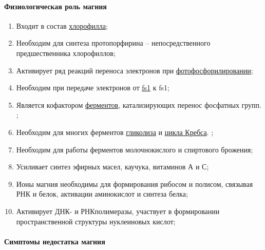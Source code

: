 \paragraph*{Физиологическая роль магния}

\begin{enumerate}
	\item Входит в состав \hyperlink{sect_hlorophilus}{хлорофилла};
	\item Необходим для синтеза протопорфирина -- непосредственного предшественника хлорофиллов;
	\item Активирует ряд реакций переноса электронов при \hyperlink{photophosforolysis}{фотофосфорилировании};
	\item Необходим при передаче электронов от \hyperlink{photosystems}{\gls{fs1}} к \gls{fs1};
	\item Является кофактором \hyperlink{enzimes}{ферментов}, катализирующих перенос фосфатных групп. ;
	\item Необходим для многих ферментов \hyperlink{glycolysis}{гликолиза} и \hyperlink{krebs_cycle}{цикла Кребса}.  ;
	\item Необходим для работы ферментов молочнокислого и спиртового брожения; 
	\item Усиливает синтез эфирных масел, каучука, витаминов А и С;
	\item Ионы магния необходимы для формирования рибосом и полисом, связывая РНК и белок, активации аминокислот и синтеза белка;
	\item Активирует ДНК- и РНКполимеразы, участвует в формировании пространственной структуры нуклеиновых кислот;
\end{enumerate}

\paragraph*{Симптомы недостатка магния}

\paragraph*{} 

